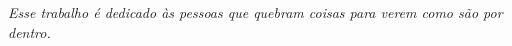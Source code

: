 \begin{dedicatoria}
   \vspace*{\fill}
   \centering
   \noindent

   \textit{Esse trabalho é dedicado às pessoas que quebram coisas para verem como são por dentro.} \vspace*{\fill}
\end{dedicatoria}
